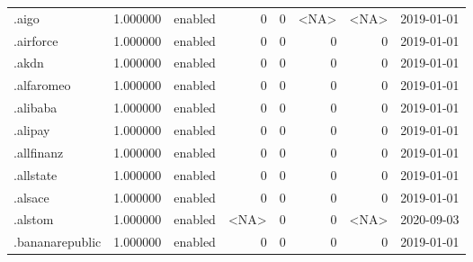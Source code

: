 \begin{tabular}{lrlrrrrl}
.aigo                     &          1.000000 &         enabled &                           0 &                           0 &                        <NA> &                <NA> &           2019-01-01 \\
.airforce                 &          1.000000 &         enabled &                           0 &                           0 &                           0 &                   0 &           2019-01-01 \\
.akdn                     &          1.000000 &         enabled &                           0 &                           0 &                           0 &                   0 &           2019-01-01 \\
.alfaromeo                &          1.000000 &         enabled &                           0 &                           0 &                           0 &                   0 &           2019-01-01 \\
.alibaba                  &          1.000000 &         enabled &                           0 &                           0 &                           0 &                   0 &           2019-01-01 \\
.alipay                   &          1.000000 &         enabled &                           0 &                           0 &                           0 &                   0 &           2019-01-01 \\
.allfinanz                &          1.000000 &         enabled &                           0 &                           0 &                           0 &                   0 &           2019-01-01 \\
.allstate                 &          1.000000 &         enabled &                           0 &                           0 &                           0 &                   0 &           2019-01-01 \\
.alsace                   &          1.000000 &         enabled &                           0 &                           0 &                           0 &                   0 &           2019-01-01 \\
.alstom                   &          1.000000 &         enabled &                        <NA> &                           0 &                           0 &                <NA> &           2020-09-03 \\
.bananarepublic           &          1.000000 &         enabled &                           0 &                           0 &                           0 &                   0 &           2019-01-01 \\

\end{tabular}
